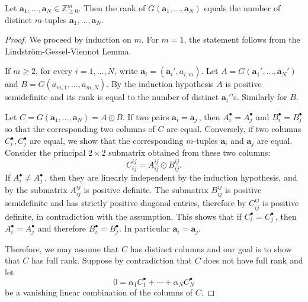 \documentclass{toc}
\newcommand{\vvirg}{ , \dots , }
\newcommand{\bfa}{\mathbf{a}}
\newcommand{\bbZ}{\mathbb{Z}}
\begin{document}
\begin{proposition}\label{prop: hadamard product of many gessel viennot}
Let $\bfa_1 \vvirg \bfa_N \in \bbZ^m_{\geq 0}$. Then the rank of $G(\bfa_1 \vvirg \bfa_N)$ equals the number of distinct $m$-tuples $\bfa_1 \vvirg \bfa_N$. 
\end{proposition}
\begin{proof}
We proceed by induction on $m$. For $m=1$, the statement follows from the Lindstr\"om-Gessel-Viennot Lemma.

If $m\geq 2$, for every $i=1 \vvirg N$, write $\bfa_i = (\bfa_i',a_{i,m})$. Let $A = G(\bfa_1' \vvirg \bfa_N')$ and $B= G(a_{m,1} \vvirg a_{m,N})$. By the induction hypothesis $A$ is positive semidefinite and its rank is equal to the number of distinct $\bfa_i'$'s. Similarly for $B$.

Let $C =  G(\bfa_1 \vvirg \bfa_N) = A \odot B$. If two pairs $\bfa_i = \bfa_j$\,, then $A^\bullet_i = A^\bullet_j$ and $B^\bullet_i = B^\bullet_j$ so that the corresponding two columns of $C$ are equal. Conversely, if two columns $C^\bullet_i,C^\bullet_j$ are equal, we show that the corresponding $m$-tuples $\bfa_i$ and $\bfa_j$ are equal. Consider the principal $2\times2$ submatrix obtained from these two columns:
\[
 C^{ij}_{ij} = A^{ij}_{ij} \odot B^{ij}_{ij}.
\]
If $A^\bullet_i \neq A^\bullet_j$\,, then they are linearly independent by the induction hypothesis, and by  the submatrix $A^{ij}_{ij}$ is positive definite. The submatrix $B^{ij}_{ij}$ is positive semidefinite and has strictly positive diagonal entries, therefore by  $C^{ij}_{ij}$ is positive definite, in contradiction with the assumption. This shows that if $C^\bullet_i = C^\bullet_j$\,, then $A^\bullet_i = A^\bullet_j$ and therefore $B^\bullet_i = B^\bullet_j$. In particular $\bfa_i = \bfa_j$.

Therefore, we may assume that $C$ has distinct columns and our goal is to show that $C$ has full rank. Suppose by contradiction that $C$ does not have full rank and let
\begin{equation}\label{eqn: vanishing linear combination of C}
0 = \alpha_1  C^\bullet_1 + \cdots + \alpha_N C^\bullet_N
\end{equation}
be a vanishing linear combination of the columns of $C$.


\end{proof}
\end{document}
